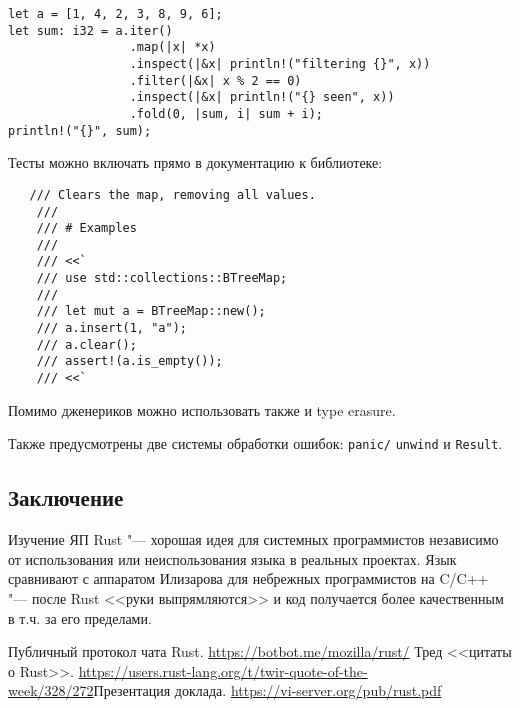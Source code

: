 \documentclass[10pt, a5paper]{article}
\begin{document}
\begin{verbatim}
let a = [1, 4, 2, 3, 8, 9, 6];
let sum: i32 = a.iter()
                 .map(|x| *x)
                 .inspect(|&x| println!("filtering {}", x))
                 .filter(|&x| x % 2 == 0)
                 .inspect(|&x| println!("{} seen", x))
                 .fold(0, |sum, i| sum + i);
println!("{}", sum);\end{verbatim}
Тесты можно включать прямо в документацию к библиотеке:

\begin{verbatim}
   /// Clears the map, removing all values.
    ///
    /// # Examples
    ///
    /// <<`
    /// use std::collections::BTreeMap;
    ///
    /// let mut a = BTreeMap::new();
    /// a.insert(1, "a");
    /// a.clear();
    /// assert!(a.is_empty());
    /// <<`\end{verbatim}
Помимо дженериков можно использовать также и type erasure.

Также предусмотрены две системы обработки ошибок: \verb!panic/! \verb!unwind! и \verb!Result!.

\subsection*{Заключение}

Изучение ЯП Rust "--- хорошая идея для системных программистов независимо от использования или неиспользования языка в реальных проектах. Язык сравнивают с аппаратом Илизарова для небрежных программистов на C/C++ "--- после Rust <<руки выпрямляются>> и код получается более качественным в т.ч. за его пределами.

\begin{thebibliography}{9}
Публичный протокол чата Rust. \url{https://botbot.me/mozilla/rust/}
Тред <<цитаты о Rust>>. \url{https://users.rust-lang.org/t/twir-quote-of-the-week/328/272}Презентация доклада. \url{https://vi-server.org/pub/rust.pdf}
\end{thebibliography}
\end{document}
